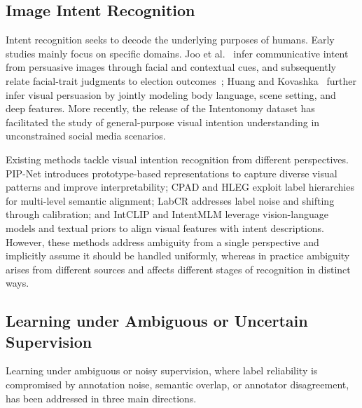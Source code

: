 \iffalse
\subsection{Image Intent Recognition}
Intent recognition seeks to decode the underlying purposes of humans. 
Early studies mainly focus on specific domains. Joo et al.~\cite{joo_visual_2014} infer communicative intent from persuasive images through facial and contextual cues, and subsequently relate facial-trait judgments to election outcomes~\cite{joo_automated_2015}; Huang and Kovashka~\cite{huang_inferring_2016} further infer visual persuasion by jointly modeling body language, scene setting, and deep features.
More recently, the release of the Intentonomy dataset \cite{jia_intentonomy_2021} has facilitated the study of general-purpose visual intention understanding in unconstrained social media scenarios.

Existing methods tackle visual intention recognition from different perspectives. PIP-Net \cite{wang_prototype-based_2023} introduces prototype-based representations to capture diverse visual patterns and improve interpretability; CPAD \cite{ye_cross-modality_2023} and HLEG \cite{shi_learnable_2023} exploit label hierarchies for multi-level semantic alignment; LabCR \cite{shi_label-aware_2024} addresses label noise and shifting through calibration; and IntCLIP \cite{leonardis_synergy_2025} and IntentMLM \cite{wang_unlocking_2026} leverage vision-language models and textual priors to align visual features with intent descriptions. However, these methods address ambiguity from a single perspective and implicitly assume it should be handled uniformly, whereas in practice ambiguity arises from different sources and affects different stages of recognition in distinct ways.

\subsection{Learning under Ambiguous or Uncertain Supervision}

Learning under ambiguous or noisy supervision, where label reliability is compromised by annotation noise, semantic overlap, or annotator disagreement, has been addressed in three main directions.

